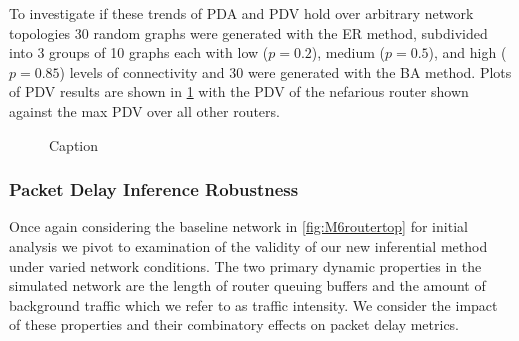 To investigate if these trends of PDA and PDV hold over arbitrary network topologies 30 random graphs were generated with the ER method, subdivided into 3 groups of 10 graphs each with low ($p=0.2$), medium ($p=0.5$), and high ($p=0.85$) levels of connectivity and 30 were generated with the BA method. Plots of PDV results are shown in \cref{fig:Rrandgraphpdv} with the PDV of the nefarious router shown against the max PDV over all other routers.

\begin{figure}[H]
    \centering
    \caption{Caption}
    \label{fig:Rrandgraphpdv}
\end{figure}

\subsubsection{Packet Delay Inference Robustness}
Once again considering the baseline network in \cref{fig:M6routertop} for initial analysis we pivot to examination of the validity of our new inferential method under varied network conditions. The two primary dynamic properties in the simulated network are the length of router queuing buffers and the amount of background traffic which we refer to as traffic intensity. We consider the impact of these properties and their combinatory effects on packet delay metrics.\par

